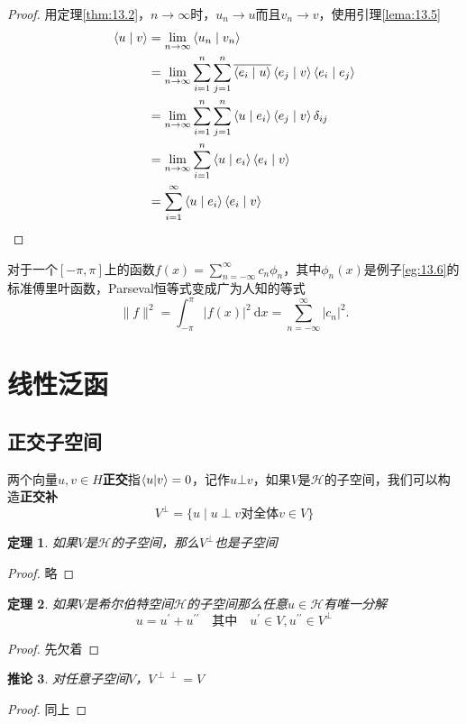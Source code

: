 \documentclass[hyperref,UTF8]{ctexbook}
\newtheorem{theorem}{定理}[chapter]
\newtheorem{corollary}[theorem]{推论}
\begin{document}
\begin{proof}
    用定理\ref{thm:13.2}，\(n\rightarrow \infty\)时，\(u_n\rightarrow u\)而且\(v_n\rightarrow v\)，使用引理\ref{lema:13.5}
    $$
\begin{aligned}
\langle u \mid v\rangle &=\lim _{n \rightarrow \infty}\left\langle u_{n} \mid v_{n}\right\rangle \\
&=\lim _{n \rightarrow \infty} \sum_{i=1}^{n} \sum_{j=1}^{n} \overline{\left\langle e_{i} \mid u\right\rangle}\left\langle e_{j} \mid v\right\rangle\left\langle e_{i} \mid e_{j}\right\rangle \\
&=\lim _{n \rightarrow \infty} \sum_{i=1}^{n} \sum_{j=1}^{n}\left\langle u \mid e_{i}\right\rangle\left\langle e_{j} \mid v\right\rangle \delta_{i j} \\
&=\lim _{n \rightarrow \infty} \sum_{i=1}^{n}\left\langle u \mid e_{i}\right\rangle\left\langle e_{i} \mid v\right\rangle \\
&=\sum_{i=1}^{\infty}\left\langle u \mid e_{i}\right\rangle\left\langle e_{i} \mid v\right\rangle \qedhere
\end{aligned}
$$
\end{proof}
对于一个\([-\pi,\pi]\)上的函数\(f(x)=\sum^{\infty}_{n=-\infty}c_n\phi_n\)，其中\(\phi_n (x)\)是例子\ref{eg:13.6}的标准傅里叶函数，Parseval恒等式变成广为人知的等式
$$
\|f\|^{2}=\int_{-\pi}^{\pi}|f(x)|^{2} \mathrm{~d} x=\sum_{n=-\infty}^{\infty}\left|c_{n}\right|^{2} .
$$
\section{线性泛函}
\subsection{正交子空间}
两个向量\(u,v\in H\)\textbf{正交}指\(\braket{u|v}=0\)，记作\(u\bot v\)，如果\(V\)是\(\mathcal{H}\)的子空间，我们可以构造\textbf{正交补}
$$
V^{\bot}=\{u \mid u \perp v \text {对全体} v \in V\}
$$
\begin{theorem}
    如果\(V\)是\(\mathcal{H}\)的子空间，那么\(V^{\perp}\)也是子空间
\end{theorem}
\begin{proof}
    略
\end{proof}
\begin{theorem}\label{thm:13.8}
    如果\(V\)是希尔伯特空间\(\mathcal{H}\)的子空间那么任意\(u\in\mathcal{H}\)有唯一分解
    $$
u=u^{\prime}+u^{\prime \prime} \quad \text {其中} \quad u^{\prime} \in V, u^{\prime \prime} \in V^{\perp} 
$$
\end{theorem}
\begin{proof}
    先欠着
\end{proof}
\begin{corollary}
    对任意子空间\(V\)，\(V^{\perp \perp}=V\)
\end{corollary}
\begin{proof}
    同上
\end{proof}
\end{document}
